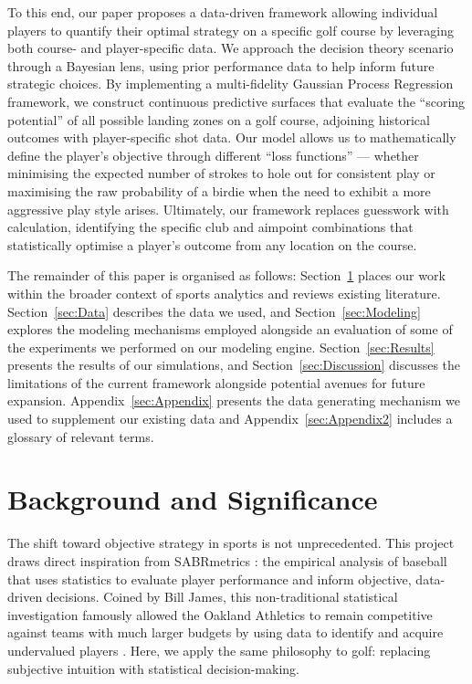 \documentclass[11pt, letterpaper]{article}
\begin{document}
To this end, our paper proposes a data-driven framework allowing individual players to quantify their optimal strategy on a specific golf course by leveraging both course- and player-specific data. We 
approach the decision theory scenario through a Bayesian lens, using prior performance data to help inform future strategic choices. By implementing a multi-fidelity Gaussian Process Regression framework, we construct continuous predictive surfaces that evaluate the ``scoring potential'' of all possible landing zones on a golf course, adjoining historical outcomes with player-specific shot data. Our model allows us to mathematically define the player's objective through different ``loss functions'' --- whether minimising the expected number of strokes to hole out for consistent play or maximising the raw probability of a birdie when the need to exhibit a more aggressive play style arises. Ultimately, our framework replaces guesswork with calculation, identifying the specific club and aimpoint combinations that statistically optimise a player's outcome from any location on the course.


The remainder of this paper is organised as follows: Section~\ref{sec:Background} places our work within the broader context of sports analytics and reviews existing literature. Section~\ref{sec:Data} describes the data we used, and Section~\ref{sec:Modeling} explores the modeling mechanisms employed alongside an evaluation of some of the experiments we performed on our modeling engine. Section~\ref{sec:Results} presents the results of our simulations, and Section~\ref{sec:Discussion} discusses the limitations of the current framework alongside potential avenues for future expansion.  Appendix~\ref{sec:Appendix} presents the data generating mechanism we used to supplement our existing data and Appendix~\ref{sec:Appendix2} includes a glossary of relevant terms.

\section{Background and Significance}
\label{sec:Background}

The shift toward objective strategy in sports is not unprecedented. This project draws direct inspiration from SABRmetrics \parencite{albert2010sabermetrics}: the empirical analysis of baseball that uses statistics to evaluate player performance and inform objective, data-driven decisions. Coined by Bill James, this non-traditional statistical investigation famously allowed the Oakland Athletics to remain competitive against teams with much larger budgets by using data to identify and acquire undervalued players \parencite{moneyball_lewis}. Here, we apply the same philosophy to golf: replacing subjective intuition with statistical decision-making.
\end{document}

